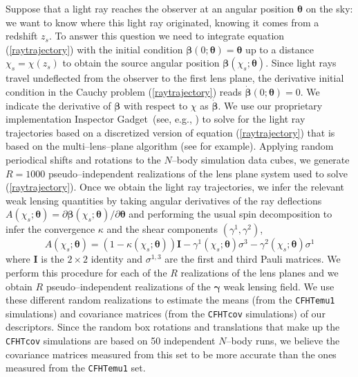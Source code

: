 \documentclass[reprint,aps,prd,superscriptaddress,showkeys,showpacs]{revtex4-1}
\begin{document}
Suppose that a light ray reaches the observer at an angular position
$\pmb{\theta}$ on the sky: we want to know where this light ray
originated, knowing it comes from a redshift $z_s$. To answer this
question we need to integrate equation (\ref{raytrajectory}) with the
initial condition $\pmb{\beta}(0;\pmb{\theta})=\pmb{\theta}$ up to a distance
$\chi_s=\chi(z_s)$ to obtain the source angular position
$\pmb{\beta}(\chi_s;\pmb{\theta})$. Since light rays travel undeflected from the observer to the first lens plane, the derivative initial condition in the Cauchy problem (\ref{raytrajectory}) reads $\dot{\pmb{\beta}}(0;\pmb{\theta})=0$. We indicate the derivative of $\pmb{\beta}$ with respect to $\chi$ as $\dot{\pmb{\beta}}$. 
%
We use our proprietary implementation Inspector Gadget~(see, e.g., \cite{KHM2010}) to solve
for the light ray trajectories based on a discretized version of equation (\ref{raytrajectory}) that is based on the multi--lens--plane algorithm (see \citep{RayTracingHartlap} for example).
Applying random periodical shifts and rotations to the $N$--body simulation data cubes, we generate $R=1000$ pseudo--independent realizations of the lens plane system used to solve (\ref{raytrajectory}). 
%
Once we obtain the light ray trajectories, we infer the relevant weak
lensing quantities by taking angular derivatives of the ray
deflections $A(\chi_s;\pmb{\theta}) = \partial
\pmb{\beta}(\chi_s;\pmb{\theta})/\partial\pmb{\theta}$ and performing
the usual spin decomposition to infer the convergence $\kappa$ and the
shear components $(\gamma^1,\gamma^2)$,
\begin{equation}
A(\chi_s;\pmb{\theta}) = (1-\kappa(\chi_s;\pmb{\theta}))\pmb{I} - \gamma^1(\chi_s;\pmb{\theta})\sigma^3 - \gamma^2(\chi_s;\pmb{\theta})\sigma^1
\end{equation}  
where $\pmb{I}$ is the $2\times2$ identity and $\sigma^{1,3}$ are the
first and third Pauli matrices. We perform this procedure for each of the $R$ realizations of the lens planes and we obtain $R$ pseudo--independent realizations of the $\pmb{\gamma}$ weak lensing field. We use these different random realizations to estimate the means (from the \texttt{CFHTemu1} simulations) and covariance matrices (from the \texttt{CFHTcov} simulations) of our descriptors. Since the random box rotations and translations that make up the \texttt{CFHTcov} simulations are based on 50 independent $N$--body runs, we believe the covariance matrices measured from this set to be more accurate than the ones measured from the \texttt{CFHTemu1} set. 
\end{document}
